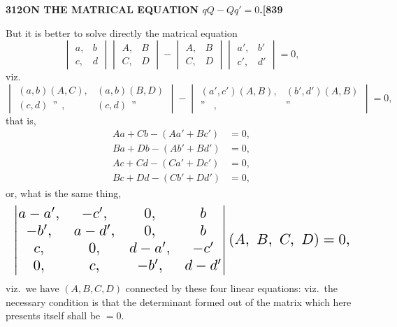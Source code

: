 \documentclass[11pt]{article}
\begin{document}
\newpage

\noindent\textbf{312}\hfill\textbf{ON THE MATRICAL EQUATION $qQ - Qq' = 0$.}\hfill\textbf{[839}

\bigskip

\noindent But it is better to solve directly the matrical equation
\[
\begin{vmatrix} a, & b \\ c, & d \end{vmatrix} \begin{vmatrix} A, & B \\ C, & D \end{vmatrix} - \begin{vmatrix} A, & B \\ C, & D \end{vmatrix} \begin{vmatrix} a', & b' \\ c', & d' \end{vmatrix} = 0,
\]
viz.
\[
\begin{vmatrix} (a, b)(A, C), & (a, b)(B, D) \\ (c, d)\ \ \text{''}\ \ , & (c, d)\ \ \text{''}\ \ \end{vmatrix} - \begin{vmatrix} (a', c')(A, B), & (b', d')(A, B) \\ \text{''}\ \ \ \ , & \text{''}\ \ \ \ \end{vmatrix} = 0,
\]
that is,
\begin{align*}
Aa + Cb - (Aa' + Bc') &= 0, \\
Ba + Db - (Ab' + Bd') &= 0, \\
Ac + Cd - (Ca' + Dc') &= 0, \\
Bc + Dd - (Cb' + Dd') &= 0,
\end{align*}
or, what is the same thing,
\[
\resizebox{\textwidth}{!}{$\displaystyle
\begin{vmatrix} a - a', & -c', & 0, & b \\ -b', & a - d', & 0, & b \\ c, & 0, & d - a', & -c' \\ 0, & c, & -b', & d - d' \end{vmatrix} (A,\ B,\ C,\ D) = 0,
$}
\]
viz.\ we have $(A, B, C, D)$ connected by these four linear equations: viz.\ the necessary condition is that the determinant formed out of the matrix which here presents itself shall be $= 0$.

\medskip
\end{document}
